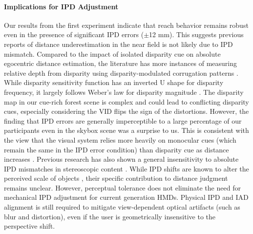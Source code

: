 \paragraph{Implications for IPD Adjustment} Our results from the first experiment indicate that reach behavior remains robust even in the presence of significant IPD errors ($\pm$12 mm). This suggests previous reports of distance underestimation in the near field is not likely due to IPD mismatch. Compared to the impact of isolated disparity cue on absolute egocentric distance estimation, the literature has more instances of measuring relative depth from disparity using disparity-modulated corrugation patterns \cite{bradshaw_sensitivity_1999,didyk2011}. While disparity sensitivity function has an inverted U shape for disparity frequency, it largely follows Weber's law for disparity magnitude \cite{didyk2011,farell_disparity_2004}. The disparity map in our cue-rich forest scene is complex and could lead to conflicting disparity cues, especially considering the VID flips the sign of the distortions. However, the finding that IPD errors are generally imperceptible to a large percentage of our participants even in the skybox scene was a surprise to us. This is consistent with the view that the visual system relies more heavily on monocular cues (which remain the same in the IPD error condition) than disparity cue as distance increases \cite{mccann_contributions_2018,hillis_slant_2004}. Previous research has also shown a general insensitivity to absolute IPD mismatches in stereoscopic content \cite{allison2015perceptual, didyk2011, guan2016, stevenson1989hyperacuity}. While IPD shifts are known to alter the perceived scale of objects \cite{kim_dwarf_2017, piumsomboon_superman_2018, mine_relationship_2020}, their specific contribution to distance judgment remains unclear. However, perceptual tolerance does not eliminate the need for mechanical IPD adjustment for current generation HMDs. Physical IPD and IAD alignment is still required to mitigate view-dependent optical artifacts (such as blur and distortion), even if the user is geometrically insensitive to the perspective shift.

